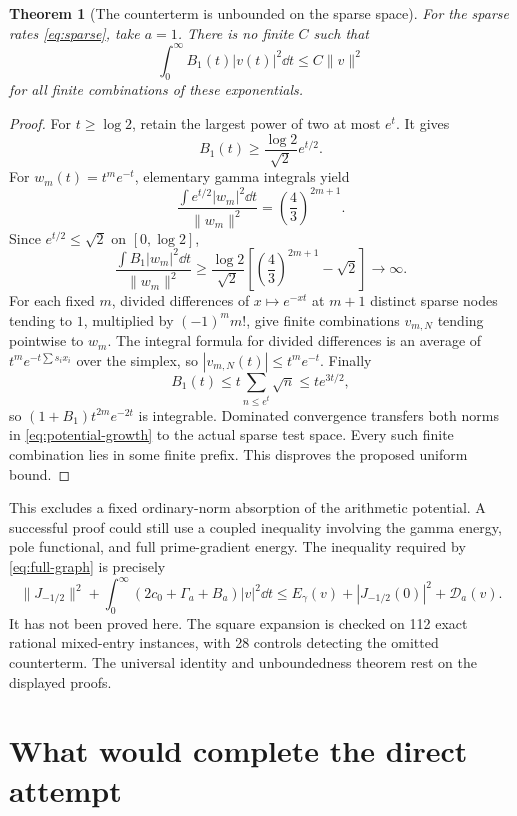 \documentclass[11pt,letterpaper]{article}
\newtheorem{theorem}{Theorem}[section]
\theoremstyle{remark}\newtheorem{remark}[theorem]{Remark}
\numberwithin{equation}{section}
\begin{document}
\begin{theorem}[The counterterm is unbounded on the sparse space]\label{thm:unbounded}
For the sparse rates \eqref{eq:sparse}, take $a=1$. There is no finite $C$ such that
\[
\int_0^\infty B_1(t)|v(t)|^2\dd t\le C\|v\|^2
\]
for all finite combinations of these exponentials.
\end{theorem}
\begin{proof}
For $t\ge\log2$, retain the largest power of two at most $e^t$. It gives
\[
B_1(t)\ge\frac{\log2}{\sqrt2}e^{t/2}.
\]
For $w_m(t)=t^me^{-t}$, elementary gamma integrals yield
\[
\frac{\int e^{t/2}|w_m|^2\dd t}{\|w_m\|^2}
=\left(\frac43\right)^{2m+1}.
\]
Since $e^{t/2}\le\sqrt2$ on $[0,\log2]$,
\begin{equation}\label{eq:potential-growth}
\frac{\int B_1|w_m|^2\dd t}{\|w_m\|^2}
\ge\frac{\log2}{\sqrt2}
\left[\left(\frac43\right)^{2m+1}-\sqrt2\right]\longrightarrow\infty.
\end{equation}
For each fixed $m$, divided differences of $x\mapsto e^{-xt}$ at $m+1$ distinct sparse nodes tending to $1$, multiplied by $(-1)^m m!$, give finite combinations $v_{m,N}$ tending pointwise to $w_m$. The integral formula for divided differences is an average of $t^m e^{-t\sum s_ix_i}$ over the simplex, so $|v_{m,N}(t)|\le t^me^{-t}$. Finally
\[
B_1(t)\le t\sum_{n\le e^t}\sqrt n\le te^{3t/2},
\]
so $(1+B_1)t^{2m}e^{-2t}$ is integrable. Dominated convergence transfers both norms in \eqref{eq:potential-growth} to the actual sparse test space. Every such finite combination lies in some finite prefix. This disproves the proposed uniform bound.
\end{proof}

This excludes a fixed ordinary-norm absorption of the arithmetic potential. A successful proof could still use a coupled inequality involving the gamma energy, pole functional, and full prime-gradient energy. The inequality required by \eqref{eq:full-graph} is precisely
\begin{equation}\label{eq:coupled-target}
\|J_{-1/2}\|^2+\int_0^\infty(2c_0+\Gamma_a+B_a)|v|^2\dd t
\le E_\gamma(v)+|J_{-1/2}(0)|^2+\mathcal D_a(v).
\end{equation}
It has not been proved here. The square expansion is checked on 112 exact rational mixed-entry instances, with 28 controls detecting the omitted counterterm. The universal identity and unboundedness theorem rest on the displayed proofs.

\section{What would complete the direct attempt}
\end{document}

